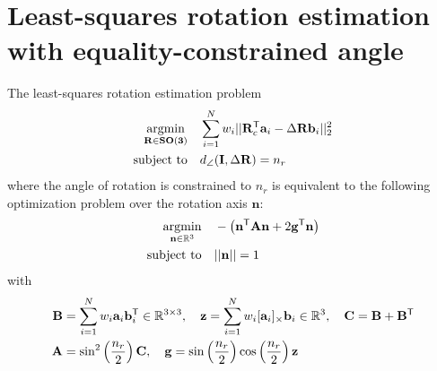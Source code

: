 \section{Least-squares rotation estimation with equality-constrained angle}
\label{proof:wls-relax-eq-constrained-rotation}

\begin{theorem}
	
	The least-squares rotation estimation problem 
	\begin{equation}
		\label{eq:tls-rwls-a}
		\begin{aligned}
			\operatorname*{argmin}_{\mathbf{R} \in \mathbf{SO(3)}}  \quad &\sum_{i=1}^{N} w_i ||\mathbf{R}_c^{\mathsf{T}} \mathbf{a}_i - \Delta\mathbf{R} \mathbf{b}_i ||_2^2 \\
			\text{subject to} \quad &d_{\angle}(\mathbf{I}, \Delta\mathbf{R}) = n_r
		\end{aligned}
	\end{equation}
	where the angle of rotation is constrained to $n_r$ is equivalent to the following optimization problem over the rotation axis $\mathbf{n}$:
	\begin{equation}
		\label{eq:rot-est-constrained-qcqp}
		\begin{aligned}
			\operatorname*{argmin}_{\mathbf{n} \in \mathbb{R}^3} \quad &-\left(\mathbf{n}^{\mathsf{T}} \mathbf{A} \mathbf{n} + 2 \mathbf{g}^{\mathsf{T}} \mathbf{n} \right)\\
			\text{subject to} \quad &|| \mathbf{n}|| = 1\\
		\end{aligned}
	\end{equation}
	with
	\begin{equation}
		\label{eq:ev-constr-data-mat-a}
		\begin{aligned}
			\mathbf{B} &= \sum_{i=1}^N w_i \mathbf{a}_i\mathbf{b}_i^{\mathsf{T}} \in \mathbb{R}^{3 \times 3}, \quad
			\mathbf{z} = \sum_{i=1}^N w_i [\mathbf{a}_i]_{\times}\mathbf{b}_i \in \mathbb{R}^{3}, \quad \mathbf{C} = \mathbf{B} + \mathbf{B}^{\mathsf{T}}\\
			\mathbf{A} &= \sin^2 \left(\frac{n_r}{2} \right) \mathbf{C}, \quad \mathbf{g} =  \sin \left(\frac{n_r}{2} \right) \cos \left(\frac{n_r}{2} \right) \mathbf{z}
		\end{aligned}
	\end{equation}
\end{theorem}

